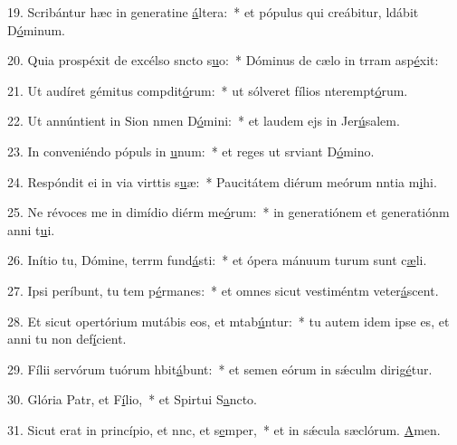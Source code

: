 19. Scribántur hæc in generatine \uline{á}ltera:~* et pópulus qui creábitur, ldábit D\uline{ó}minum.\par 
20. Quia prospéxit de excélso sncto s\uline{u}o:~* Dóminus de cælo in trram asp\uline{é}xit:\par 
21. Ut audíret gémitus compdit\uline{ó}rum:~* ut sólveret fílios nterempt\uline{ó}rum.\par 
22. Ut annúntient in Sion nmen D\uline{ó}mini:~* et laudem ejs in Jer\uline{ú}salem.\par 
23. In conveniéndo pópuls in \uline{u}num:~* et reges ut srviant D\uline{ó}mino.\par 
24. Respóndit ei in via virttis s\uline{u}æ:~* Paucitátem diérum meórum nntia m\uline{i}hi.\par 
25. Ne révoces me in dimídio diérm me\uline{ó}rum:~* in generatiónem et generatiónm anni t\uline{u}i.\par 
26. Inítio tu, Dómine, terrm fund\uline{á}sti:~* et ópera mánuum turum sunt c\uline{æ}li.\par 
27. Ipsi períbunt, tu tem p\uline{é}rmanes:~* et omnes sicut vestiméntm veter\uline{á}scent.\par 
28. Et sicut opertórium mutábis eos, et mtab\uline{ú}ntur:~* tu autem idem ipse es, et anni tu non def\uline{í}cient.\par 
29. Fílii servórum tuórum hbit\uline{á}bunt:~* et semen eórum in sǽculm dirig\uline{é}tur.\par 
30. Glória Patr, et F\uline{í}lio,~* et Spirtui S\uline{a}ncto.\par 
31. Sicut erat in princípio, et nnc, et s\uline{e}mper,~* et in sǽcula sæclórum. \uline{A}men.\par 
